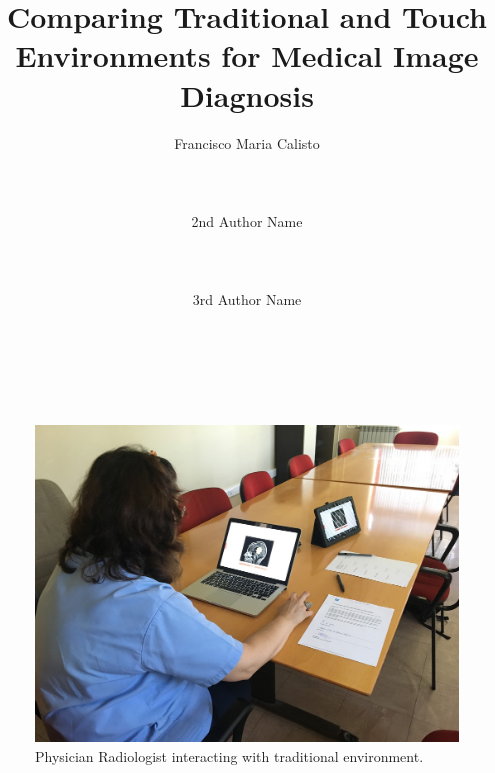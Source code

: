 \documentclass{sigchi}
\begin{document}
\title{Comparing Traditional and Touch Environments for Medical Image Diagnosis}

\author{
  \alignauthor Francisco Maria Calisto\\
    \\
    \\
    \\
  \alignauthor 2nd Author Name\\
    \\
    \\
    \\
  \alignauthor 3rd Author Name\\
    \\
    \\
    \\
}

\maketitle

\begin{figure}[h]
\centering
\includegraphics[width=1.0\columnwidth]{IMG_4987.JPG}
\caption{Physician Radiologist interacting with traditional environment.}
\label{fig:Fig1}
\end{figure}
\end{document}
